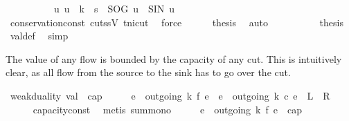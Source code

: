 \begin{isabellebody}
\ \ \isamarkupfalse%
\ {\isacharminus}\isanewline
\ \ \ \ \isamarkupfalse%
\ {\isachardoublequoteopen}{\isacharparenleft}{\isasymAnd}u{\isachardot}\ u\ {\isasymin}\ k\ {\isacharminus}\ {\isacharbraceleft}s{\isacharbraceright}\ {\isasymLongrightarrow}\ {\isacharquery}SOG\ u\ {\isacharequal}\ {\isacharquery}SIN\ u{\isacharparenright}{\isachardoublequoteclose}\ \isanewline
\ \ \ \ \ \ \isamarkupfalse%
\ conservation{\isacharunderscore}const\ cut{\isacharunderscore}ss{\isacharunderscore}V\ t{\isacharunderscore}ni{\isacharunderscore}cut\ \isamarkupfalse%
\ force\isanewline
\ \ \ \ \isamarkupfalse%
\ {\isacharquery}thesis\ \isamarkupfalse%
\ auto\ \ \isanewline
\ \ \isamarkupfalse%
\isanewline
\ \ \isamarkupfalse%
\ \isamarkupfalse%
\ {\isacharquery}thesis\ \isamarkupfalse%
\ val{\isacharunderscore}def\ \isamarkupfalse%
\ simp\isanewline
{}\isamarkupfalse%
%
\endisatagproof
{\isafoldproof}%
%
\isadelimproof
%
\endisadelimproof
%
\begin{isamarkuptext}%
The value of any flow is bounded by the capacity of any cut.
  This is intuitively clear, as all flow from the source to the sink has to go
  over the cut.%
\end{isamarkuptext}\isamarkuptrue%
\isamarkupfalse%
\ weak{\isacharunderscore}duality{\isacharcolon}\ {\isachardoublequoteopen}val\ {\isasymle}\ cap{\isachardoublequoteclose}\isanewline
%
\isadelimproof
%
\endisadelimproof
%
\isatagproof
{}\isamarkupfalse%
\ {\isacharminus}\isanewline
\ \ \isamarkupfalse%
\ {\isachardoublequoteopen}{\isacharparenleft}{\isasymSum}e\ {\isasymin}\ outgoing{\isacharprime}\ k{\isachardot}\ f\ e{\isacharparenright}\ {\isasymle}\ {\isacharparenleft}{\isasymSum}e\ {\isasymin}\ outgoing{\isacharprime}\ k{\isachardot}\ c\ e{\isacharparenright}{\isachardoublequoteclose}\ {\isacharparenleft}\ {\isachardoublequoteopen}{\isacharquery}L\ {\isasymle}\ {\isacharquery}R{\isachardoublequoteclose}{\isacharparenright}\ \isanewline
\ \ \ \ \isamarkupfalse%
\ capacity{\isacharunderscore}const\ \isamarkupfalse%
\ {\isacharparenleft}metis\ sum{\isacharunderscore}mono{\isacharparenright}\isanewline
\ \ \isamarkupfalse%
\ \isamarkupfalse%
\ {\isachardoublequoteopen}{\isacharparenleft}{\isasymSum}e\ {\isasymin}\ outgoing{\isacharprime}\ k{\isachardot}\ f\ e{\isacharparenright}\ {\isasymle}\ cap{\isachardoublequoteclose}\ \isamarkupfalse%

\end{isabellebody}
